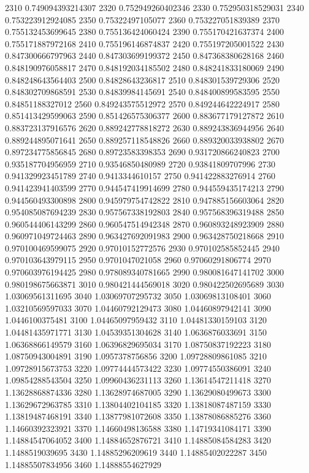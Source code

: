 {2310 0.749094393214307
2320 0.752949260402346
2330 0.752950318529031
2340 0.753223912924085
2350 0.75322497105077
2360 0.753227051839389
2370 0.755132453699645
2380 0.755136424060424
2390 0.755170421637374
2400 0.755171887972168
2410 0.755196146874837
2420 0.755197205001522
2430 0.847300666797963
2440 0.847303699199372
2450 0.847368380628168
2460 0.848190976058817
2470 0.848192034185502
2480 0.848241833180069
2490 0.848248643564403
2500 0.84828643236817
2510 0.848301539729306
2520 0.848302709868591
2530 0.84839984145691
2540 0.848400899583595
2550 0.84851188327012
2560 0.849243575512972
2570 0.849244642224917
2580 0.851413429599063
2590 0.851426575306377
2600 0.883677179127872
2610 0.883723137916576
2620 0.889242778818272
2630 0.889243836944956
2640 0.889244895071641
2650 0.889257118548826
2660 0.889320033938802
2670 0.897234775856845
2680 0.89723583398353
2690 0.931720866240823
2700 0.935187704956959
2710 0.93546850480989
2720 0.93841809707996
2730 0.941329923451789
2740 0.9413344610157
2750 0.941422883276914
2760 0.941423941403599
2770 0.944547419914699
2780 0.944559435174213
2790 0.944560493300898
2800 0.945979754742822
2810 0.947885156603064
2820 0.954085087694239
2830 0.957567338192803
2840 0.957568396319488
2850 0.960544406143299
2860 0.960547514942348
2870 0.960893248923909
2880 0.960971049724463
2890 0.963427692091983
2900 0.963428750218668
2910 0.970100469599075
2920 0.97010152772576
2930 0.970102585852445
2940 0.970103643979115
2950 0.9701047021058
2960 0.97060291806774
2970 0.970603976194425
2980 0.978089340781665
2990 0.980081647141702
3000 0.980198675663871
3010 0.980421444569018
3020 0.980422502695689
3030 1.03069561311695
3040 1.03069707295732
3050 1.03069813108401
3060 1.03210569597033
3070 1.04460792129473
3080 1.04460897942141
3090 1.0446100375481
3100 1.04465097959432
3110 1.04481330159103
3120 1.04481435971771
3130 1.04539351304628
3140 1.0636876033691
3150 1.06368866149579
3160 1.06396829695034
3170 1.08750837192223
3180 1.08750943004891
3190 1.0957378756856
3200 1.09728809861085
3210 1.09728915673753
3220 1.09774444573422
3230 1.09774550386091
3240 1.09854288543504
3250 1.09960436231113
3260 1.13614547211418
3270 1.13628868874336
3280 1.13628974687005
3290 1.13629080499673
3300 1.13629672963785
3310 1.13804402104185
3320 1.13818087487159
3330 1.13819487468191
3340 1.13877981072608
3350 1.13878086885276
3360 1.14660392323921
3370 1.14660498136588
3380 1.14719341084171
3390 1.14884547064052
3400 1.14884652876721
3410 1.14885084584283
3420 1.1488519039695
3430 1.14885296209619
3440 1.14885402022287
3450 1.14885507834956
3460 1.14888554627929
}
